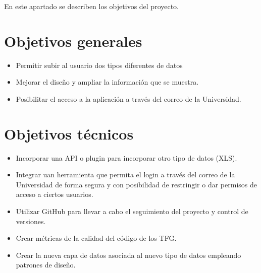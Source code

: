 En este apartado se describen los objetivos del proyecto.

\section{Objetivos generales}
\begin{itemize}
	\item Permitir subir al usuario dos tipos diferentes de datos
	\item Mejorar el diseño y ampliar la información que se muestra.
	\item Posibilitar el acceso a la aplicación a través del correo de la Universidad. 
\end{itemize}

\section{Objetivos técnicos}
\begin{itemize}
	\item Incorporar una API o plugin para incorporar otro tipo de datos (XLS).
	\item Integrar uan herramienta que permita el login a través del correo de la Universidad de forma segura y con posibilidad de restringir o dar permisos de acceso a ciertos usuarios. 
	\item Utilizar GitHub para llevar a cabo el seguimiento del proyecto y control de versiones.
	\item Crear métricas de la calidad del código de los TFG.
	\item Crear la nueva capa de datos asociada al nuevo tipo de datos empleando patrones de diseño.
\end{itemize}